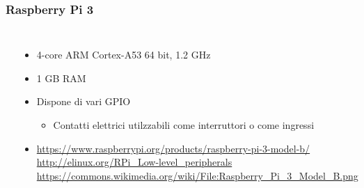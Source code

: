 \documentclass[xetex,table]{beamer}
\begin{document}
\begin{frame}
  \frametitle{Raspberry Pi 3}
  \begin{columns}
    \includegraphics[width=\textwidth]{images/Raspberry_Pi_3_Model_B.jpg}
    \begin{itemize}
    \item 4-core ARM Cortex-A53 64 bit, 1.2 GHz
    \item 1 GB RAM
    \item Dispone di vari GPIO
      \begin{itemize}
      \item Contatti elettrici utilzzabili come interruttori o come ingressi
      \end{itemize}
    \item {\tiny
      \url{https://www.raspberrypi.org/products/raspberry-pi-3-model-b/}
      \url{http://elinux.org/RPi_Low-level_peripherals}
      \url{https://commons.wikimedia.org/wiki/File:Raspberry_Pi_3_Model_B.png}
    }
    \end{itemize}
  \end{columns}
\end{frame}
\end{document}
